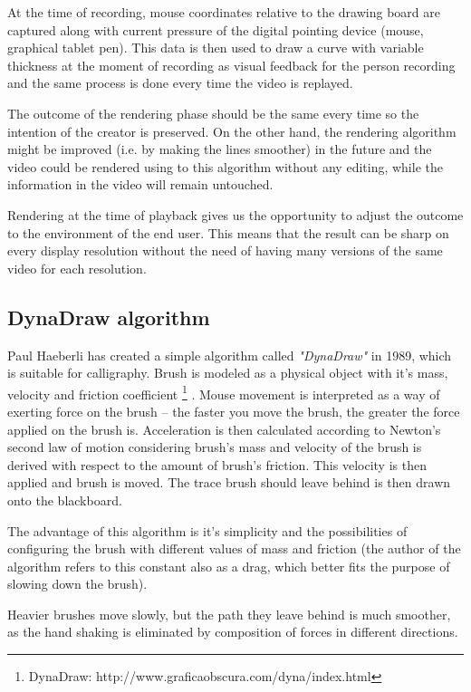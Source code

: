 At the time of recording, mouse coordinates relative to the drawing board are captured along with current pressure of the digital pointing device (mouse, graphical tablet pen). This data is then used to draw a curve with variable thickness at the moment of recording as visual feedback for the person recording and the same process is done every time the video is replayed.

The outcome of the rendering phase should be the same every time so the intention of the creator is preserved. On the other hand, the rendering algorithm might be improved (i.e. by making the lines smoother) in the future and the video could be rendered using to this algorithm without any editing, while the information in the video will remain untouched.

Rendering at the time of playback gives us the opportunity to adjust the outcome to the environment of the end user. This means that the result can be sharp on every display resolution without the need of having many versions of the same video for each resolution.

\subsection{DynaDraw algorithm}

Paul Haeberli has created a simple algorithm called \textit{"DynaDraw"} in 1989, which is suitable for calligraphy. Brush is modeled as a physical object with it's mass, velocity and friction coefficient \footnote{DynaDraw: http://www.graficaobscura.com/dyna/index.html} \cite{}. Mouse movement is interpreted as a way of exerting force on the brush -- the faster you move the brush, the greater the force applied on the brush is. Acceleration is then calculated according to Newton's second law of motion considering brush's mass and velocity of the brush is derived with respect to the amount of brush's friction. This velocity is then applied and brush is moved. The trace brush should leave behind is then drawn onto the blackboard.

The advantage of this algorithm is it's simplicity and the possibilities of configuring the brush with different values of mass and friction (the author of the algorithm refers to this constant also as a drag, which better fits the purpose of slowing down the brush).

Heavier brushes move slowly, but the path they leave behind is much smoother, as the hand shaking is eliminated by composition of forces in different directions.

